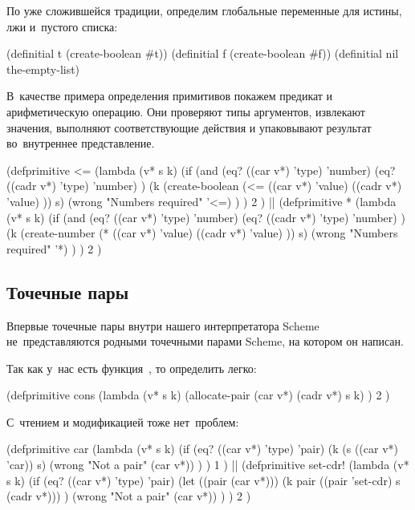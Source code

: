 По уже сложившейся традиции, определим глобальные переменные для истины, лжи
и~пустого списка:

\begin{code:lisp}
(definitial t (create-boolean #t))
(definitial f (create-boolean #f))
(definitial nil the-empty-list)
\end{code:lisp}

В~качестве примера определения примитивов покажем предикат и арифметическую
операцию. Они проверяют типы аргументов, извлекают значения, выполняют
соответствующие действия и упаковывают результат во~внутреннее представление.

\begin{code:lisp}
(defprimitive <=
  (lambda (v* s k)
    (if (and (eq? ((car v*)  'type) 'number)
             (eq? ((cadr v*) 'type) 'number) )
        (k (create-boolean (<= ((car v*) 'value)
                               ((cadr v*) 'value) )) s)
        (wrong "Numbers required" '<=) ) )
  2 )
||
(defprimitive *
  (lambda (v* s k)
    (if (and (eq? ((car v*)  'type) 'number)
             (eq? ((cadr v*) 'type) 'number) )
        (k (create-number (* ((car v*) 'value)
                             ((cadr v*) 'value) )) s)
        (wrong "Numbers required" '*) ) )
  2 )
\end{code:lisp}


\subsection{Точечные пары}\label{assignment/implementation/ssect:dotted-pairs}

Впервые точечные пары внутри нашего интерпретатора Scheme не~представляются
родными точечными парами Scheme, на котором он написан.

Так как у~нас есть функция~, то определить 
легко:


\begin{code:lisp}
(defprimitive cons
  (lambda (v* s k)
    (allocate-pair (car v*) (cadr v*) s k) )
  2 )
\end{code:lisp}

\noindent
С~чтением и модификацией тоже нет~проблем:

\begin{code:lisp}
(defprimitive car
  (lambda (v* s k)
    (if (eq? ((car v*) 'type) 'pair)
        (k (s ((car v*) 'car)) s)
        (wrong "Not a pair" (car v*)) ) )
  1 )
||
(defprimitive set-cdr!
  (lambda (v* s k)
    (if (eq? ((car v*) 'type) 'pair)
        (let ((pair (car v*)))
          (k pair ((pair 'set-cdr) s (cadr v*))) )
        (wrong "Not a pair" (car v*)) ) )
  2 )
\end{code:lisp}

